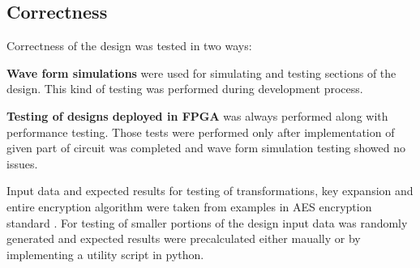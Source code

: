 \subsection{Correctness}
Correctness of the design was tested in two ways:
\begin{description}
\item {\textbf{Wave form simulations}} were used for simulating and testing sections of the design. This kind of testing was performed during development process.
\item {\textbf{Testing of designs deployed in FPGA}} was always performed along with performance testing. Those tests were performed only after implementation of given part of circuit was completed and wave form simulation testing showed no issues.
\end{description}

Input data and expected results for testing of transformations, key expansion and entire encryption algorithm were taken from examples in AES encryption standard \cite{aes-standard}. For testing of smaller portions of the design input data was randomly generated and expected results were precalculated either maually or by implementing a utility script in python.
